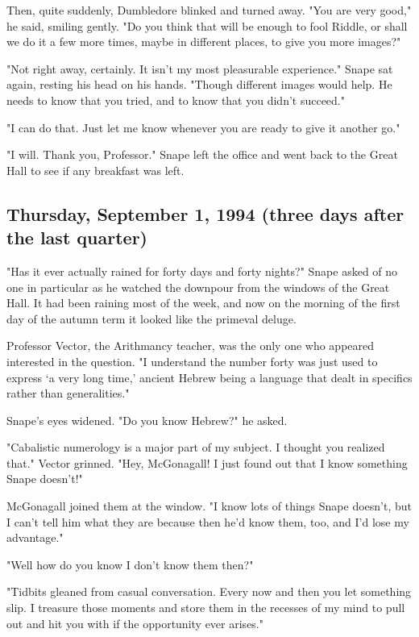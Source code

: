 Then, quite suddenly, Dumbledore blinked and turned away. "You are very good," he said, smiling gently. "Do you think that will be enough to fool Riddle, or shall we do it a few more times, maybe in different places, to give you more images?"

"Not right away, certainly. It isn't my most pleasurable experience." Snape sat again, resting his head on his hands. "Though different images would help. He needs to know that you tried, and to know that you didn't succeed."

"I can do that. Just let me know whenever you are ready to give it another go."

"I will. Thank you, Professor." Snape left the office and went back to the Great Hall to see if any breakfast was left.

\sbreak

\subsection{Thursday, September 1, 1994 (three days after the last quarter)}

"Has it ever actually rained for forty days and forty nights?" Snape asked of no one in particular as he watched the downpour from the windows of the Great Hall. It had been raining most of the week, and now on the morning of the first day of the autumn term it looked like the primeval deluge.

Professor Vector, the Arithmancy teacher, was the only one who appeared interested in the question. "I understand the number forty was just used to express `a very long time,' ancient Hebrew being a language that dealt in specifics rather than generalities."

Snape's eyes widened. "Do you know Hebrew?" he asked.

"Cabalistic numerology is a major part of my subject. I thought you realized that." Vector grinned. "Hey, McGonagall! I just found out that I know something Snape doesn't!"

McGonagall joined them at the window. "I know lots of things Snape doesn't, but I can't tell him what they are because then he'd know them, too, and I'd lose my advantage."

"Well how do you know I don't know them then?"

"Tidbits gleaned from casual conversation. Every now and then you let something slip. I treasure those moments and store them in the recesses of my mind to pull out and hit you with if the opportunity ever arises."

